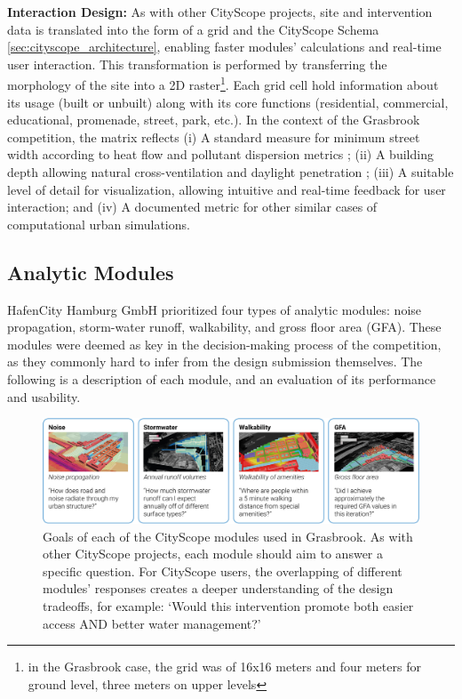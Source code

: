 {    \textbf{Interaction Design:} As with other CityScope projects, site and intervention data is translated into the form of a grid and the CityScope Schema \eqref{sec:cityscope_architecture}, enabling faster modules' calculations and real-time user interaction. This transformation is performed by transferring the morphology of the site into a 2D raster\footnote{in the Grasbrook case, the grid was of 16x16 meters and four meters for ground level, three meters on upper levels}. Each grid cell hold information about its usage (built or unbuilt) along with its core functions (residential, commercial, educational, promenade, street, park, etc.). In the context of the Grasbrook competition, the matrix reflects (i) A standard measure for minimum street width according to heat flow and pollutant dispersion metrics \cite{yc18}; (ii) A building depth allowing natural cross-ventilation and daylight penetration \cite{mn19}; (iii) A suitable level of detail for visualization, allowing intuitive and real-time feedback for user interaction; and (iv) A documented metric for other similar cases of computational urban simulations.


    \subsection{Analytic Modules}

    {
        HafenCity Hamburg GmbH prioritized four types of analytic modules: noise propagation, storm-water runoff, walkability, and gross floor area (GFA). These modules were deemed as key in the decision-making process of the competition, as they commonly hard to infer from the design submission themselves. The following is a description of each module, and an evaluation of its performance and usability.

        \begin{figure}[!htb]
            \begin{center}
                \includegraphics[width=1\textwidth]{chapters/transformation/grasbrook/figures/grsbrk2.jpg}
            \end{center}
            \caption{Goals of each of the CityScope modules used in Grasbrook. As with other CityScope projects, each module should aim to answer a specific question. For CityScope users, the overlapping of different modules' responses creates a deeper understanding of the design tradeoffs, for example: `Would this intervention promote both easier access AND better water management?'}
            \label{fig:grasbrook_modlues_questions}
        \end{figure}


}}
